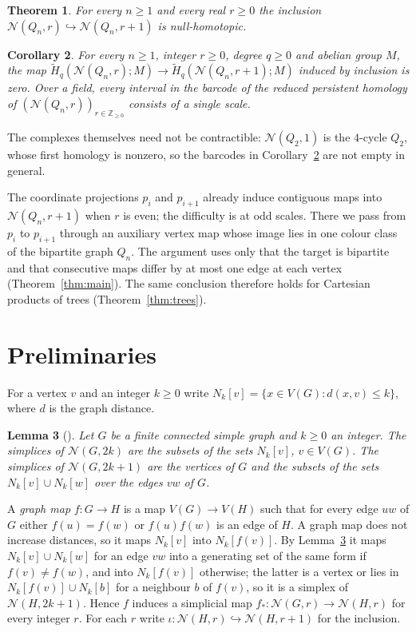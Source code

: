 \documentclass[11pt]{amsart}
\newtheorem{theorem}{Theorem}[section]
\newtheorem{lemma}[theorem]{Lemma}
\newtheorem{corollary}[theorem]{Corollary}
\theoremstyle{remark}
\newcommand{\N}{\mathcal{N}}
\newcommand{\cl}[2]{N_{#1}[#2]}
\begin{document}
\begin{theorem}\label{thm:cube}
For every $n\ge1$ and every real $r\ge0$ the inclusion $\N(Q_n,r)\hookrightarrow\N(Q_n,r+1)$ is null-homotopic.
\end{theorem}

\begin{corollary}\label{cor:pers}
For every $n\ge1$, integer $r\ge0$, degree $q\ge0$ and abelian group $M$, the map
$\widetilde H_q(\N(Q_n,r);M)\to\widetilde H_q(\N(Q_n,r+1);M)$ induced by inclusion is zero. Over a field, every interval in
the barcode of the reduced persistent homology of $(\N(Q_n,r))_{r\in\mathbb Z_{\ge0}}$ consists of a single scale.
\end{corollary}

The complexes themselves need not be contractible: $\N(Q_2,1)$ is the $4$-cycle $Q_2$, whose first homology is
nonzero, so the barcodes in Corollary~\ref{cor:pers} are not empty in general.

The coordinate projections $p_i$ and $p_{i+1}$ already induce contiguous maps into $\N(Q_n,r+1)$ when $r$ is even; the
difficulty is at odd scales. There we pass from $p_i$ to $p_{i+1}$ through an auxiliary vertex map whose image lies in
one colour class of the bipartite graph $Q_n$. The argument uses only that the target is bipartite and that consecutive
maps differ by at most one edge at each vertex (Theorem~\ref{thm:main}). The same conclusion therefore holds for
Cartesian products of trees (Theorem~\ref{thm:trees}).

\section{Preliminaries}

For a vertex $v$ and an integer $k\ge0$ write $\cl kv=\{x\in V(G):d(x,v)\le k\}$, where $d$ is the graph distance.

\begin{lemma}[{\cite[Lemma~2.2]{ASS}}]\label{lem:ASS}
Let $G$ be a finite connected simple graph and $k\ge0$ an integer. The simplices of $\N(G,2k)$ are the subsets of the
sets $\cl kv$, $v\in V(G)$. The simplices of $\N(G,2k+1)$ are the vertices of $G$ and the subsets of the sets
$\cl kv\cup\cl kw$ over the edges $vw$ of $G$.
\end{lemma}

A \emph{graph map} $f\colon G\to H$ is a map $V(G)\to V(H)$ such that for every edge $uw$ of $G$ either $f(u)=f(w)$ or
$f(u)f(w)$ is an edge of $H$. A graph map does not increase distances, so it maps $\cl kv$ into $\cl k{f(v)}$. By
Lemma~\ref{lem:ASS} it maps $\cl kv\cup\cl kw$ for an edge $vw$ into a generating set of the same form if $f(v)\ne f(w)$,
and into $\cl k{f(v)}$ otherwise; the latter is a vertex or lies in $\cl k{f(v)}\cup\cl kb$ for a neighbour $b$ of
$f(v)$, so it is a simplex of $\N(H,2k+1)$. Hence $f$ induces a simplicial map $f_*\colon\N(G,r)\to\N(H,r)$ for every integer $r$.
For each $r$ write $\iota\colon\N(H,r)\hookrightarrow\N(H,r+1)$ for the inclusion.
\end{document}

